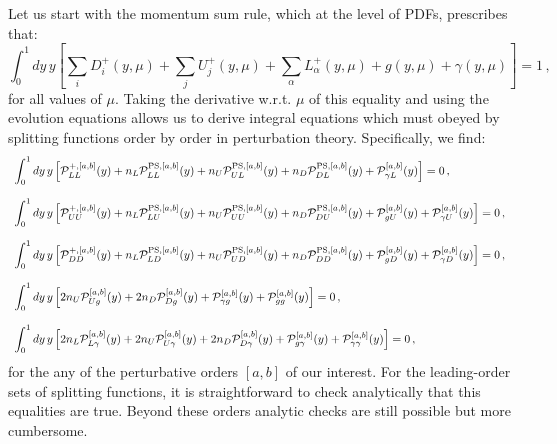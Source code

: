 \documentclass[10pt,a4paper]{article}
\begin{document}
Let us start with the momentum sum rule, which at the level of PDFs,
prescribes that:
\begin{equation}
  \int_0^1dy\,y\left[\sum_{i}D_i^+(y,\mu)+\sum_{j}U_j^+(y,\mu)+\sum_{\alpha}L_\alpha^+(y,\mu)+g(y,\mu)+\gamma(y,\mu)\right]=1\,,
\end{equation}
for all values of $\mu$. Taking the derivative w.r.t. $\mu$ of this
equality and using the evolution equations allows us to derive
integral equations which must obeyed by splitting functions order by
order in perturbation theory. Specifically, we find:
\begin{equation}
\begin{array}{l}
\displaystyle
  \int_0^1dy\,y\left[\mathcal{P}_{LL}^{+,[a,b]}(y)+n_L\mathcal{P}_{LL}^{{\rm PS},[a,b]}(y) +n_U\mathcal{P}_{UL}^{{\rm PS},[a,b]}(y) +n_D\mathcal{P}_{DL}^{{\rm PS},[a,b]}(y)+\mathcal{P}_{\gamma L}^{[a,b]}(y)\right]=0\,,\\
\\
\displaystyle \int_0^1dy\,y\left[\mathcal{P}_{UU}^{+,[a,b]}(y) +n_L\mathcal{P}_{LU}^{{\rm PS},[a,b]}(y) +n_U\mathcal{P}_{UU}^{{\rm PS},[a,b]}(y) +n_D\mathcal{P}_{DU}^{{\rm PS},[a,b]}(y)+\mathcal{P}_{gU}^{[a,b]}(y)+\mathcal{P}_{\gamma U}^{[a,b]}(y)\right]=0\,,\\
\\
\displaystyle \int_0^1dy\,y\left[\mathcal{P}_{DD}^{+,[a,b]}(y) +n_L\mathcal{P}_{LD}^{{\rm PS},[a,b]}(y) +n_U\mathcal{P}_{UD}^{{\rm PS},[a,b]}(y) +n_D\mathcal{P}_{DD}^{{\rm PS},[a,b]}(y)+\mathcal{P}_{gD}^{[a,b]}(y)+\mathcal{P}_{\gamma D}^{[a,b]}(y)\right]=0\,,\\
\\
\displaystyle\int_0^1dy\,y\left[2n_U\mathcal{P}_{Ug}^{[a,b]}(y)+2n_D\mathcal{P}_{Dg}^{[a,b]}(y)+\mathcal{P}_{\gamma g}^{[a,b]}(y) +\mathcal{P}_{gg}^{[a,b]}(y)\right]=0\,,\\
\\
\displaystyle \int_0^1dy\,y\left[2n_L\mathcal{P}_{L\gamma}^{[a,b]}(y)+2n_U\mathcal{P}_{U\gamma}^{[a,b]}(y)+2n_D\mathcal{P}_{D\gamma}^{[a,b]}(y) +\mathcal{P}_{g\gamma}^{[a,b]}(y)+\mathcal{P}_{\gamma\gamma}^{[a,b]}(y)\right]=0\,,
\end{array}
\end{equation}
for the any of the perturbative orders $[a,b]$ of our interest. For
the leading-order sets of splitting functions, it is straightforward
to check analytically that this equalities are true. Beyond these
orders analytic checks are still possible but more cumbersome.
\end{document}

